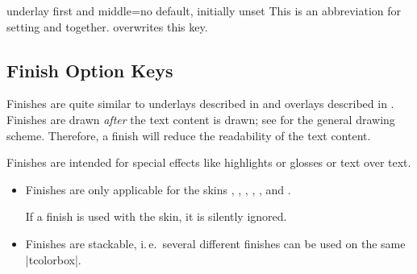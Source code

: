 \begin{docTcbKey}[][doc new=2014-09-19]{underlay first and middle}{=}{no default, initially unset}
  This is an abbreviation for setting
   and
   together.
   overwrites this key.
\end{docTcbKey}


\clearpage
\subsection{Finish Option Keys}\label{subsec:skinfinish}

Finishes are quite similar to underlays described in 
and overlays described in .
Finishes are drawn \emph{after} the text content is drawn; see
 for the general drawing scheme.
Therefore, a finish will reduce the readability of the text content.

Finishes are intended for special effects like highlights or glosses or text over text.

\begin{itemize}
\item Finishes are only applicable for the skins
  ,
  ,
  ,
  ,
  , and
  .
  \begin{marker}
  If a finish is used with the  skin, it is silently ignored.
  \end{marker}
\item Finishes are stackable, i.\,e.\ several different finishes can be
  used on the same |tcolorbox|.
\end{itemize}

